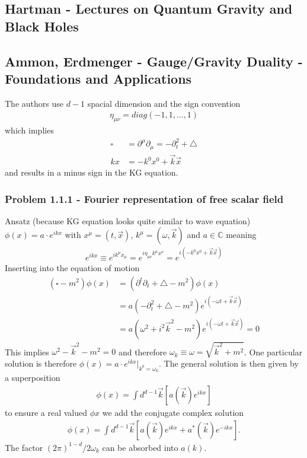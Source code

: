 \documentclass[10pt,a4paper]{article}
\theoremstyle{definition}
\begin{document}
\subsection{{\sc Hartman} - Lectures on Quantum Gravity and Black Holes}


\subsection{{\sc Ammon, Erdmenger} - Gauge/Gravity Duality - Foundations and Applications}
The authors use $d-1$ spacial dimension and the sign convention 
\begin{align}
\eta_{\mu\nu}=diag(-1,1,...,1)
\end{align}
which implies 
\begin{align}
    \square&=\partial^\mu\partial_\mu=-\partial_t^2+\triangle\\
    kx&=-k^0x^0+\vec{k}\vec{x}
\end{align}
and results in a minus sign in the KG equation.

\subsubsection{Problem 1.1.1 - Fourier representation of free scalar field}
Ansatz (because KG equation looks quite similar to wave equation) $\phi(x)=a\cdot e^{ikx}$ with $x^\mu=(t,\vec{x})$, $k^\mu=(\omega,\vec{k})$ and $a\in\mathbb{C}$ meaning 
\begin{align}
    e^{ikx}\equiv e^{ik^{\mu}x_{\mu}}=e^{i\eta_{\mu\nu}k^{\mu}x^{\nu}}=e^{i(-k^0x^0+\vec{k}\vec{x})}
\end{align}
Inserting into the equation of motion
\begin{align}
    (\square - m^2)\phi(x)&=(\partial^t\partial_t + \triangle - m^2)\phi(x)\\
    &=a(-\partial_t^2 + \triangle - m^2)e^{i(-\omega t+\vec{k}\vec{x})}\\
    &=a\left(\omega^2 + i^2\vec{k}^2 - m^2\right)e^{i(-\omega t+\vec{k}\vec{x})}=0 
\end{align}
This implies $\omega^2-\vec{k}^2-m^2=0$ and therefore $\omega_k\equiv\omega=\sqrt{\vec{k}^2+m^2}$. One particular solution is therefore $\phi(x)=a\cdot e^{ikx}|_{k^0=\omega_k}$. The general solution is then given by a superposition
\begin{align}
    \phi(x)=\int d^{d-1}\vec{k}\left[a(\vec{k})e^{ikx}\right]
\end{align}
to ensure a real valued $\phi{x}$ we add the conjugate complex solution
\begin{align}
    \phi(x)=\int d^{d-1}\vec{k}\left[a(\vec{k})e^{ikx} + a^*(\vec{k})e^{-ikx}\right].
\end{align}
The factor $(2\pi)^{1-d}/2\omega_k$ can be absorbed into $a(k)$.
\end{document}

